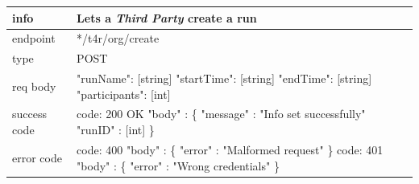 \documentclass[titlepage]{article}
\begin{document}
	\begin{tabularx}{\textwidth}{lX} \hline
		info & Lets a {\it Third Party} create a run \\ \hline
		endpoint & */t4r/org/create \\ \hline
		type & POST \\ \hline
		req body &  
		"runName": [string] \newline
		"startTime": [string] \newline
		"endTime": [string] \newline
		"participants": [int] \\ \hline
		success code &
		code: 200 OK \newline  
		"body" : \{ \newline
		"message" : "Info set successfully" \newline
		"runID" : [int] \newline
		\} \\ \hline
		error code &
		code: 400 \newline
		"body" : \{ "error" : "Malformed request" \} \newline \newline
		code: 401 \newline
		"body" : \{ "error" : "Wrong credentials" \} \\ \hline
	\end{tabularx}
	
	
\end{document}
